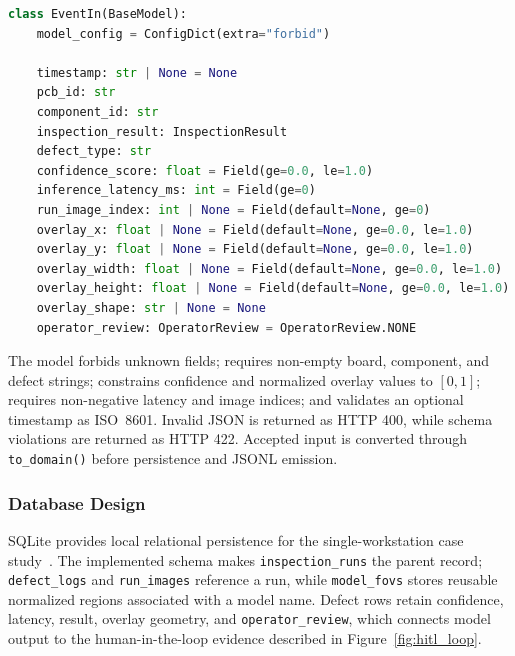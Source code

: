 \documentclass[12pt,a4paper]{article}
\begin{document}
\begin{lstlisting}[language=Python,caption={Pydantic event request model used by the implemented API.},label={lst:event_in}]
class EventIn(BaseModel):
    model_config = ConfigDict(extra="forbid")

    timestamp: str | None = None
    pcb_id: str
    component_id: str
    inspection_result: InspectionResult
    defect_type: str
    confidence_score: float = Field(ge=0.0, le=1.0)
    inference_latency_ms: int = Field(ge=0)
    run_image_index: int | None = Field(default=None, ge=0)
    overlay_x: float | None = Field(default=None, ge=0.0, le=1.0)
    overlay_y: float | None = Field(default=None, ge=0.0, le=1.0)
    overlay_width: float | None = Field(default=None, ge=0.0, le=1.0)
    overlay_height: float | None = Field(default=None, ge=0.0, le=1.0)
    overlay_shape: str | None = None
    operator_review: OperatorReview = OperatorReview.NONE
\end{lstlisting}

The model forbids unknown fields; requires non-empty board, component, and
defect strings; constrains confidence and normalized overlay values to
\([0,1]\); requires non-negative latency and image indices; and validates an
optional timestamp as ISO~8601. Invalid JSON is returned as HTTP 400, while
schema violations are returned as HTTP 422. Accepted input is converted through
\texttt{to\_domain()} before persistence and JSONL emission.

\subsubsection{Database Design}
SQLite provides local relational persistence for the single-workstation case
study~\cite{gaffney2022sqlite}. The implemented schema makes
\texttt{inspection\_runs} the parent record; \texttt{defect\_logs} and
\texttt{run\_images} reference a run, while \texttt{model\_fovs} stores reusable
normalized regions associated with a model name. Defect rows retain confidence,
latency, result, overlay geometry, and \texttt{operator\_review}, which connects
model output to the human-in-the-loop evidence described in
Figure~\ref{fig:hitl_loop}.
\end{document}
